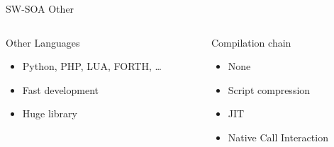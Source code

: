 %
\begin{Frame}{SW-SOA Other}
  \begin{columns}[t]
    \begin{column}{5cm} %
      \begin{block}{Other Languages}
        \begin{itemize}
        \item Python, PHP, LUA, FORTH, \ldots
        \item Fast development
        \item Huge library
        \end{itemize}
      \end{block} 
    \end{column}
    
    \begin{column}{5cm} %
      \begin{block}{Compilation chain}
        \begin{itemize}
        \item None
        \item Script compression
        \item JIT
        \item Native Call Interaction \TBD
        \end{itemize}
      \end{block}   
    \end{column}
  \end{columns}  
\end{Frame}


